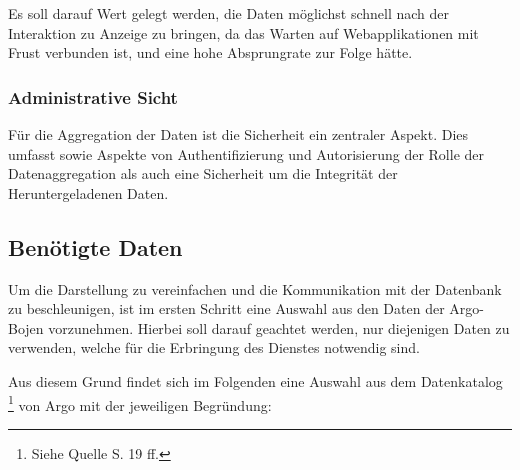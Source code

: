         Es soll darauf Wert gelegt werden, die Daten möglichst schnell nach der Interaktion zu Anzeige zu bringen, da das Warten auf Webapplikationen mit Frust verbunden ist, und eine hohe Absprungrate zur Folge hätte.
        
        
    \subsubsection{Administrative Sicht}
        Für die Aggregation der Daten ist die Sicherheit ein zentraler Aspekt. Dies umfasst sowie Aspekte von Authentifizierung und Autorisierung der Rolle der Datenaggregation als auch eine Sicherheit um die Integrität der Heruntergeladenen Daten.
    

\subsection{Benötigte Daten}

Um die Darstellung zu vereinfachen und die Kommunikation mit der Datenbank zu beschleunigen, ist im ersten Schritt eine Auswahl aus den Daten der Argo-Bojen vorzunehmen. Hierbei soll darauf geachtet werden, nur diejenigen Daten zu verwenden, welche für die Erbringung des Dienstes notwendig sind.

Aus diesem Grund findet sich im Folgenden eine Auswahl aus dem Datenkatalog \footnote{Siehe Quelle \cite{ArgoUserManual} S. 19 ff.} von Argo mit der jeweiligen Begründung:

